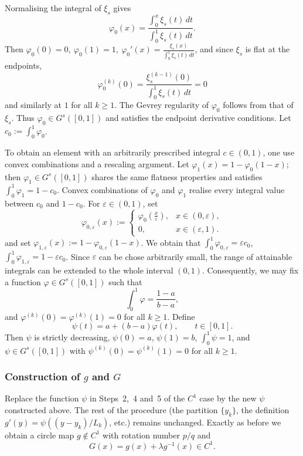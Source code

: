 \documentclass{amsart}
\begin{document}
	Normalising the integral of $\xi_s$ gives
	\[
	\varphi_0(x)=\frac{\int_0^x\xi_s(t)\,dt}{\int_0^1\xi_s(t)\,dt}.
	\]
	Then \(\varphi_0(0)=0,\ \varphi_0(1)=1,\ \varphi_0'(x)=\frac{\xi_s(x)}{\int_0^1\xi_s(t)\,dt}\), and since \(\xi_s\) is flat at the endpoints, \[\varphi_0^{(k)}(0)=\frac{\xi_s^{(k-1)}(0)}{\int_0^1\xi_s(t)\,dt}=0\] and similarly at \(1\) for all \(k\ge1\). The Gevrey regularity of \(\varphi_0\) follows from that of \(\xi_s\). Thus \(\varphi_0\in G^s([0,1])\) and satisfies the endpoint derivative conditions. Let \(c_0:=\int_0^1\varphi_0\).
	
	To obtain an element with an arbitrarily prescribed integral \(c\in(0,1)\), one use convex combinations and a rescaling argument.
	Let \(\varphi_1(x)=1-\varphi_0(1-x)\); then \(\varphi_1\in G^s([0,1])\) shares the same flatness properties and satisfies \(\int_0^1\varphi_1=1-c_0\).
	Convex combinations of \(\varphi_0\) and \(\varphi_1\) realise every integral value between \(c_0\) and \(1-c_0\).
	For $\varepsilon\in(0,1)$, set
	\[
	\varphi_{0,\varepsilon}(x):=\begin{cases}
		\varphi_0(\frac{x}{\varepsilon}), & x\in(0,\varepsilon),\\
		0, & x\in(\varepsilon,1).
	\end{cases}
	\]
	and set $\varphi_{1,\varepsilon}(x):=1-\varphi_{0,\varepsilon}(1-x)$. We obtain that $\int_{0}^{1}\varphi_{0,\varepsilon}=\varepsilon c_0$, $\int_{0}^{1}\varphi_{1,\varepsilon}=1-\varepsilon c_0$.
	Since $\varepsilon$ can be chose arbitrarily small, the range of attainable integrals can be extended to the whole interval \((0,1)\).
	Consequently, we may fix a function \(\varphi\in G^s([0,1])\) such that
	\[
	\int_0^1\varphi=\frac{1-a}{b-a},
	\]
	and \(\varphi^{(k)}(0)=\varphi^{(k)}(1)=0\) for all \(k\ge 1\).
	Define
	\[
	\psi(t)=a+(b-a)\varphi(t),\qquad t\in[0,1].
	\]
	Then \(\psi\) is strictly decreasing, \(\psi(0)=a\), \(\psi(1)=b\), \(\int_0^1\psi=1\), and \(\psi\in G^s([0,1])\) with \(\psi^{(k)}(0)=\psi^{(k)}(1)=0\) for all \(k\ge 1\).
	
	\vspace{1ex}
	
	\subsubsection{Construction of \(g\) and \(G\)}
	Replace the function \(\psi\) in Steps~2,~4 and~5 of the \(C^1\) case by the new \(\psi\) constructed above.
	The rest of the procedure (the partition \(\{y_k\}\), the definition \(g'(y)=\psi((y-y_k)/L_k)\), etc.) remains unchanged.
	Exactly as before we obtain a circle map \(g\notin C^1\) with rotation number \(p/q\) and \[G(x)=g(x)+\lambda g^{-1}(x)\in C^1.\]
	
\end{document}

